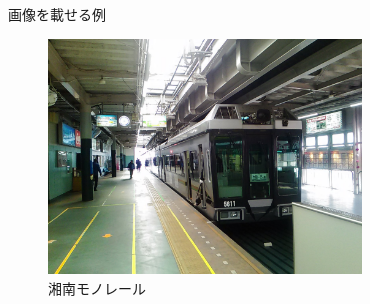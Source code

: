 \begin{frame}{画像を載せる例}
    \begin{figure}[htbp]
        \centering
        \includegraphics[width=8.31cm]{shonan_monorail.jpg}
        \caption{湘南モノレール}
    \end{figure}
\end{frame}
